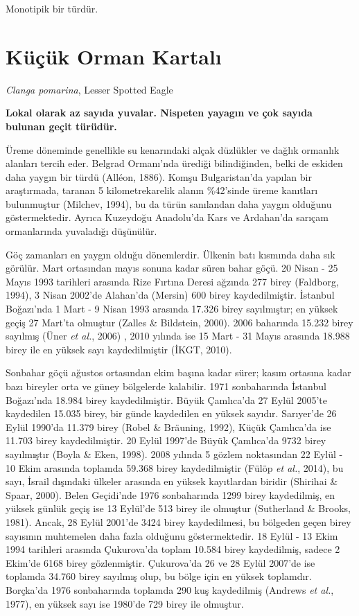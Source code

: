 \documentclass[
  a4paper,
  DIV=11,
  numbers=noendperiod]{scrreprt}
\begin{document}
Monotipik bir türdür.

\section{Küçük Orman Kartalı}\label{kuxfcuxe7uxfck-orman-kartalux131}

\emph{Clanga pomarina}, Lesser Spotted Eagle

\textbf{Lokal olarak az sayıda yuvalar. Nispeten yayagın ve çok sayıda
bulunan geçit türüdür.}

Üreme döneminde genellikle su kenarındaki alçak düzlükler ve dağlık
ormanlık alanları tercih eder. Belgrad Ormanı'nda ürediği bilindiğinden,
belki de eskiden daha yaygın bir türdü (Alléon, 1886). Komşu
Bulgaristan'da yapılan bir araştırmada, taranan 5 kilometrekarelik
alanın \%42'sinde üreme kanıtları bulunmuştur (Milchev, 1994), bu da
türün sanılandan daha yaygın olduğunu göstermektedir. Ayrıca Kuzeydoğu
Anadolu'da Kars ve Ardahan'da sarıçam ormanlarında yuvaladığı düşünülür.

Göç zamanları en yaygın olduğu dönemlerdir. Ülkenin batı kısmında daha
sık görülür. Mart ortasından mayıs sonuna kadar süren bahar göçü. 20
Nisan - 25 Mayıs 1993 tarihleri arasında Rize Fırtına Deresi ağzında 277
birey (Faldborg, 1994), 3 Nisan 2002'de Alahan'da (Mersin) 600 birey
kaydedilmiştir. İstanbul Boğazı'nda 1 Mart - 9 Nisan 1993 arasında
17.326 birey sayılmıştır; en yüksek geçiş 27 Mart'ta olmuştur (Zalles \&
Bildstein, 2000). 2006 baharında 15.232 birey sayılmış (Üner \emph{et
al.}, 2006) , 2010 yılında ise 15 Mart - 31 Mayıs arasında 18.988 birey
ile en yüksek sayı kaydedilmiştir (İKGT, 2010).

Sonbahar göçü ağustos ortasından ekim başına kadar sürer; kasım ortasına
kadar bazı bireyler orta ve güney bölgelerde kalabilir. 1971
sonbaharında İstanbul Boğazı'nda 18.984 birey kaydedilmiştir. Büyük
Çamlıca'da 27 Eylül 2005'te kaydedilen 15.035 birey, bir günde
kaydedilen en yüksek sayıdır. Sarıyer'de 26 Eylül 1990'da 11.379 birey
(Robel \& Bräuning, 1992), Küçük Çamlıca'da ise 11.703 birey
kaydedilmiştir. 20 Eylül 1997'de Büyük Çamlıca'da 9732 birey sayılmıştır
(Boyla \& Eken, 1998). 2008 yılında 5 gözlem noktasından 22 Eylül - 10
Ekim arasında toplamda 59.368 birey kaydedilmiştir (Fülöp \emph{et al.},
2014), bu sayı, İsrail dışındaki ülkeler arasında en yüksek kayıtlardan
biridir (Shirihai \& Spaar, 2000). Belen Geçidi'nde 1976 sonbaharında
1299 birey kaydedilmiş, en yüksek günlük geçiş ise 13 Eylül'de 513 birey
ile olmuştur (Sutherland \& Brooks, 1981). Ancak, 28 Eylül 2001'de 3424
birey kaydedilmesi, bu bölgeden geçen birey sayısının muhtemelen daha
fazla olduğunu göstermektedir. 18 Eylül - 13 Ekim 1994 tarihleri
arasında Çukurova'da toplam 10.584 birey kaydedilmiş, sadece 2 Ekim'de
6168 birey gözlenmiştir. Çukurova'da 26 ve 28 Eylül 2007'de ise toplamda
34.760 birey sayılmış olup, bu bölge için en yüksek toplamdır. Borçka'da
1976 sonbaharında toplamda 290 kuş kaydedilmiş (Andrews \emph{et al.},
1977), en yüksek sayı ise 1980'de 729 birey ile olmuştur.
\end{document}
